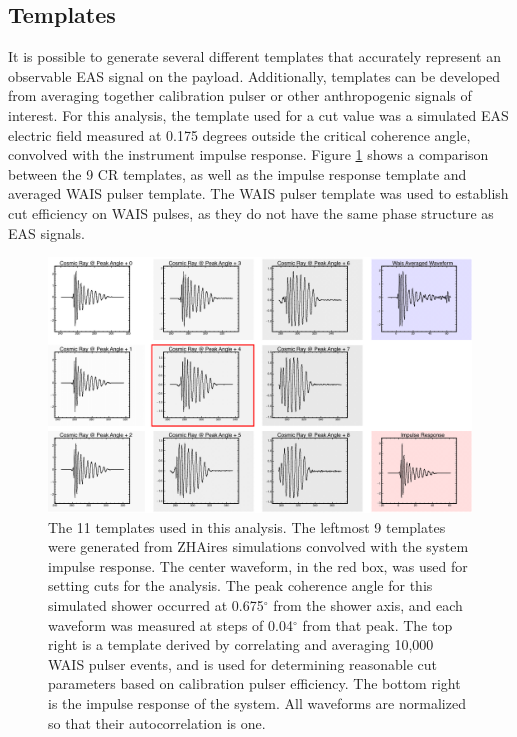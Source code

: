 	
	\subsection{Templates}
		It is possible to generate several different templates that accurately represent an observable EAS signal on the payload.  Additionally, templates can be developed from averaging together calibration pulser or other anthropogenic signals of interest.  For this analysis, the template used for a cut value was a simulated EAS electric field measured at 0.175 degrees outside the critical coherence angle, convolved with the instrument impulse response.  Figure \ref{fig:templates} shows a comparison between the 9 CR templates, as well as the impulse response template and averaged WAIS pulser template.  The WAIS pulser template was used to establish cut efficiency on WAIS pulses, as they do not have the same phase structure as EAS signals.
		
\begin{figure}
	\centering
	\includegraphics[width=\textwidth]{figures/templates}
	\caption{The 11 templates used in this analysis.  The leftmost 9 templates were generated from ZHAires simulations convolved with the system impulse response. The center waveform, in the red box, was used for setting cuts for the analysis.  The peak coherence angle for this simulated shower occurred at 0.675$^{\circ}$ from the shower axis, and each waveform was measured at steps of 0.04$^{\circ}$ from that peak.  The top right is a template derived by correlating and averaging 10,000 WAIS pulser events, and is used for determining reasonable cut parameters based on calibration pulser efficiency.  The bottom right is the impulse response of the system.  All waveforms are normalized so that their autocorrelation is one.} 
	\label{fig:templates}
\end{figure}		
		
